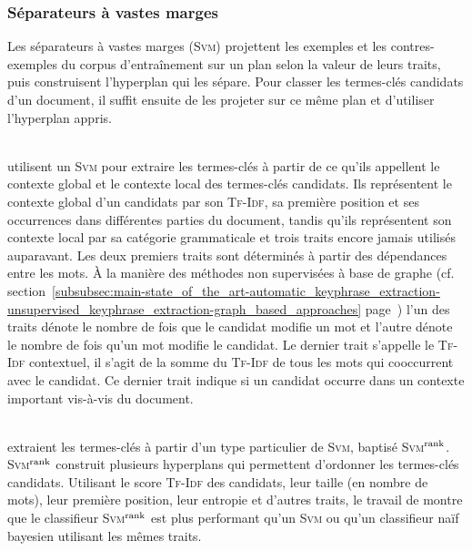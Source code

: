       \subsubsection{Séparateurs à vastes marges}
      \label{subsubsec:main-state_of_the_art-automatic_keyphrase_extraction-supervised_keyphrase_extraction-svms}
        Les séparateurs à vastes marges (\textsc{Svm}) projettent les exemples
        et les contres-exemples du corpus d'entraînement sur un plan selon la
        valeur de leurs traits, puis construisent l'hyperplan qui les sépare.
        Pour classer les termes-clés candidats d'un document, il suffit ensuite
        de les projeter sur ce même plan et d'utiliser l'hyperplan appris.

        ~\\ utilisent un \textsc{Svm} pour extraire les
        termes-clés à partir de ce qu'ils appellent le contexte global et le
        contexte local des termes-clés candidats. Ils représentent le contexte
        global d'un candidats par son \textsc{Tf-Idf}, sa première position et
        ses occurrences dans différentes parties du document, tandis qu'ils
        représentent son contexte local par sa catégorie grammaticale et trois
        traits encore jamais utilisés auparavant. Les deux premiers traits sont
        déterminés à partir des dépendances entre les mots. À la manière des
        méthodes non supervisées à base de graphe (cf.
        section~\ref{subsubsec:main-state_of_the_art-automatic_keyphrase_extraction-unsupervised_keyphrase_extraction-graph_based_approaches}
        page~\pageref{subsubsec:main-state_of_the_art-automatic_keyphrase_extraction-unsupervised_keyphrase_extraction-graph_based_approaches})
        l'un des traits dénote le nombre de fois que le candidat modifie un mot
        et l'autre dénote le nombre de fois qu'un mot modifie le candidat. Le
        dernier trait s'appelle le \textsc{Tf-Idf} contextuel, il s'agit de la
        somme du \textsc{Tf-Idf} de tous les mots qui cooccurrent avec le
        candidat. Ce dernier trait indique si un candidat occurre dans un
        contexte important vis-à-vis du document.

        ~\\ extraient les termes-clés à partir d'un
        type particulier de \textsc{Svm}, baptisé
        \textsc{Svm}$^\textnormal{rank}$. \textsc{Svm}$^\textnormal{rank}$
        construit plusieurs hyperplans qui permettent d'ordonner les termes-clés
        candidats. Utilisant le score \textsc{Tf-Idf} des candidats, leur taille
        (en nombre de mots), leur première position, leur entropie et d'autres
        traits, le travail de  montre que le
        classifieur \textsc{Svm}$^\textnormal{rank}$ est plus performant qu'un
        \textsc{Svm} ou qu'un classifieur naïf bayesien utilisant les mêmes
        traits.

